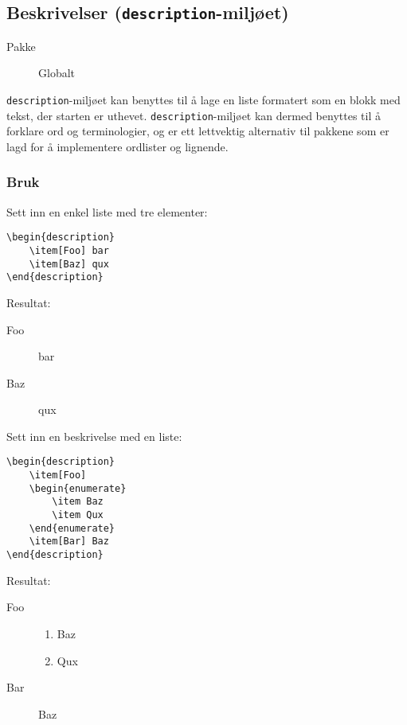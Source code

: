 \subsection{Beskrivelser (\texttt{description}-miljøet)}
\label{env:description}
\begin{description}
    \item[Pakke] Globalt
\end{description}

\texttt{description}-miljøet kan benyttes til å lage en liste formatert som en blokk med tekst, der starten er uthevet.
\texttt{description}-miljøet kan dermed benyttes til å forklare ord og terminologier, og er ett lettvektig alternativ til pakkene som er lagd for å implementere ordlister og lignende.

\subsubsection*{Bruk}
Sett inn en enkel liste med tre elementer:
\vspace{0.75em}
\begin{lstlisting}[language=Tex]
\begin{description}
    \item[Foo] bar
    \item[Baz] qux
\end{description}
\end{lstlisting}

\noindent Resultat:
\begin{description}
    \item[Foo] bar
    \item[Baz] qux
\end{description}
\vspace{0.75em}


\horizontalrule


\vspace{0.75em}
\noindent Sett inn en beskrivelse med en liste:
\vspace{0.75em}
\begin{lstlisting}[language=Tex]
\begin{description}
    \item[Foo]
    \begin{enumerate}
        \item Baz
        \item Qux
    \end{enumerate}
    \item[Bar] Baz
\end{description}
\end{lstlisting}
\vspace{0.75em}

\noindent Resultat:
\begin{description}
    \item[Foo]
    \begin{enumerate}
        \item Baz
        \item Qux
    \end{enumerate}
    \item[Bar] Baz
\end{description}
